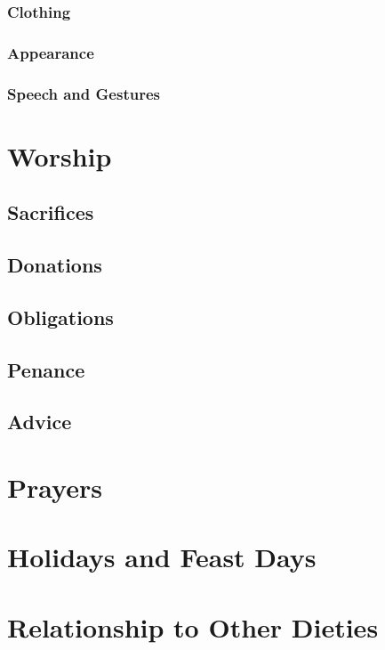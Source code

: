 \subsubsection{Clothing}
\subsubsection{Appearance}
\subsubsection{Speech and Gestures}
\section{Worship}
\subsection{Sacrifices}
\subsection{Donations}
\subsection{Obligations}
\subsection{Penance}
\subsection{Advice}
\section{Prayers}
\section{Holidays and Feast Days}
\section{Relationship to Other Dieties}


